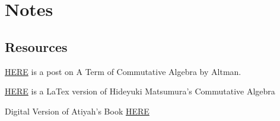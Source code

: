 \section{Notes}

\subsection{Resources}


\href{https://mathoverflow.net/questions/385312/latest-a-term-of-commutative-algebra-by-altman-and-kleiman}{HERE} is a post on A Term of Commutative Algebra by Altman.

\href{https://aareyanmanzoor.github.io/assets/matsumura-CA.pdf}{HERE} is a LaTex version of Hideyuki Matsumura's Commutative Algebra

Digital Version of Atiyah's Book \href{https://digitalcommons.unl.edu/cgi/viewcontent.cgi?article=1004&context=mathclass}{HERE}